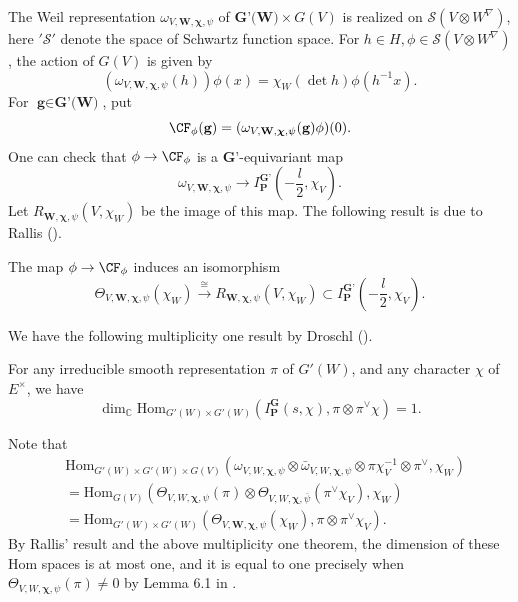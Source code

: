 \documentclass[twoside]{amsart}
\newcommand{\BC}{{\mathbb {C}}} \newcommand{\BD}{{\mathbb {D}}}
\newcommand{\CS}{{\mathcal {S}}} \newcommand{\CT}{{\mathcal {T}}}
\newcommand{\Hom}{{\mathrm{Hom}}} \renewcommand{\Im}{{\mathrm{Im}}}
\theoremstyle{plain}
\numberwithin{equation}{section}
\begin{document}
The Weil representation $\omega_{V,\textbf{W},\boldsymbol{\chi},\psi}$ of $\textbf{G'(W)}\times G(V)$ is realized on $\CS(V\otimes W^\nabla)$, here $'\CS'$ denote the space of Schwartz function space. For $h\in H, \phi\in \CS(V\otimes W^\nabla)$, the action of $G(V)$ is given by
\[
(\omega_{V,\textbf{W},\boldsymbol{\chi},\psi}(h))\phi(x)=\chi_W(\det h)\phi(h^{-1}x).
\]
For $\textbf{g}\in \textbf{G'(W)}$, put
\[
\CF_\phi(\textbf{g})=(\omega_{V,\textbf{W},\boldsymbol{\chi},\psi}(\textbf{g})\phi)(0).
\]
One can check that $\phi\to \CF_\phi$ is a $\textbf{G'}$-equivariant map
\[
\omega_{V,\textbf{W},\boldsymbol{\chi},\psi} \to I_{\textbf{P}}^{\textbf{G'}}(-\frac{l}{2},\chi_V).
\]
Let $R_{\textbf{W},\boldsymbol{\chi},\psi}(V,\chi_W)$ be the image of this map. The following result is due to Rallis (\cite{Ra84}).

\begin{proposition}
The map $\phi\to \CF_\phi$ induces an isomorphism
\begin{displaymath}
\Theta_{V,\textbf{W},\boldsymbol{\chi},\psi}(\chi_W)\stackrel{\cong} {\longrightarrow} R_{\textbf{W},\boldsymbol{\chi},\psi}(V,\chi_W) \subset I_{\textbf{P}}^{\textbf{G'}}(-\frac{l}{2},\chi_V).
\end{displaymath}
\end{proposition}

We have the following multiplicity one result by Droschl (\cite{D23}).

\begin{proposition}
For any irreducible smooth representation $\pi$ of $G'(W)$, and any character $\chi$ of $E^\times$, we have
\[
\dim_\BC \Hom_{G'(W)\times G'(W)} (I_{\textbf{P}}^{\textbf{G}}(s,\chi), \pi\otimes \pi^\vee \chi)=1.
\]
\end{proposition}

Note that
\begin{align*}
& \Hom_{G'(W)\times G'(W)\times G(V)} (\omega_{V,W,\boldsymbol{\chi},\psi}\otimes \bar{\omega}_{V,W,\boldsymbol{\chi},\psi} \otimes \pi \chi_V^{-1}\otimes \pi^\vee , \chi_W ) \\ 
&= \Hom_{G(V)} (\Theta_{V,W,\boldsymbol{\chi},\psi}(\pi)\otimes \Theta_{V,W,\boldsymbol{\chi},\bar{\psi}}(\pi^\vee \chi_V), \chi_W )  \\
&= \Hom_{G'(W)\times G'(W)}(\Theta_{V,\textbf{W},\boldsymbol{\chi},\psi}(\chi_W), \pi\otimes \pi^\vee \chi_V ).
\end{align*}
By Rallis' result and the above multiplicity one theorem, the dimension of these Hom spaces is at most one, and it is equal to one precisely when $\Theta_{V,W,\boldsymbol{\chi},\psi}(\pi)\neq 0$ by Lemma 6.1 in \cite{GI14}. 
\end{document}
